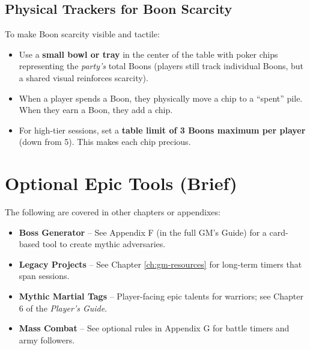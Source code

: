 \subsection*{Physical Trackers for Boon Scarcity}
To make Boon scarcity visible and tactile:
\begin{itemize}
  \item Use a \textbf{small bowl or tray} in the center of the table with poker chips representing the \emph{party's} total Boons (players still track individual Boons, but a shared visual reinforces scarcity).
  \item When a player spends a Boon, they physically move a chip to a ``spent'' pile. When they earn a Boon, they add a chip.
  \item For high-tier sessions, set a \textbf{table limit of 3 Boons maximum per player} (down from 5). This makes each chip precious.
\end{itemize}

\section{Optional Epic Tools (Brief)}

The following are covered in other chapters or appendixes:

\begin{itemize}
  \item \textbf{Boss Generator} -- See Appendix F (in the full GM's Guide) for a card-based tool to create mythic adversaries.
  \item \textbf{Legacy Projects} -- See Chapter \ref{ch:gm-resources} for long-term timers that span sessions.
  \item \textbf{Mythic Martial Tags} -- Player-facing epic talents for warriors; see Chapter 6 of the \textit{Player's Guide}.
  \item \textbf{Mass Combat} -- See optional rules in Appendix G for battle timers and army followers.
\end{itemize}

